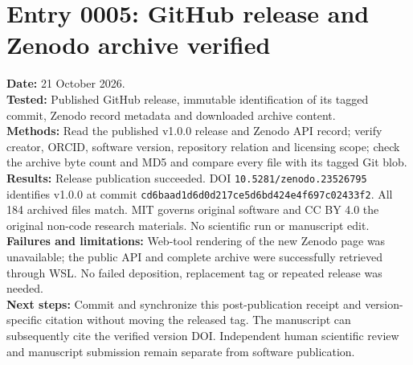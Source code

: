 \section*{Entry 0005: GitHub release and Zenodo archive verified}
\textbf{Date:} 21 October 2026.\\
\textbf{Tested:} Published GitHub release, immutable identification of its tagged
commit, Zenodo record metadata and downloaded archive content.\\
\textbf{Methods:} Read the published v1.0.0 release and Zenodo API record;
verify creator, ORCID, software version, repository relation and licensing scope;
check the archive byte count and MD5 and compare every file with its tagged Git blob.\\
\textbf{Results:} Release publication succeeded. DOI
\texttt{10.5281/zenodo.23526795} identifies v1.0.0 at commit
\texttt{cd6baad1d6d0d217ce5d6bd424e4f697c02433f2}.
All 184 archived files match. MIT governs original software and CC BY 4.0 the
original non-code research materials. No scientific run or manuscript edit.\\
\textbf{Failures and limitations:} Web-tool rendering of the new Zenodo page was
unavailable; the public API and complete archive were successfully retrieved
through WSL. No failed deposition, replacement tag or repeated release was needed.\\
\textbf{Next steps:} Commit and synchronize this post-publication receipt and
version-specific citation without moving the released tag. The manuscript can
subsequently cite the verified version DOI. Independent human scientific review
and manuscript submission remain separate from software publication.
